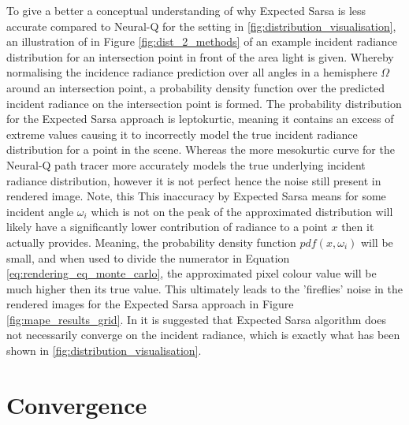 \documentclass[../dissertation.tex]{subfiles}
\begin{document}
To give a better a conceptual understanding of why Expected Sarsa is less accurate compared to Neural-Q for the setting in \ref{fig:distribution_visualisation}, an illustration of in Figure \ref{fig:dist_2_methods} of an example incident radiance distribution for an intersection point in front of the area light is given. Whereby normalising the incidence radiance prediction over all angles in a hemisphere $\Omega$ around an intersection point, a probability density function over the predicted incident radiance on the intersection point is formed. The probability distribution for the Expected Sarsa approach is leptokurtic, meaning it contains an excess of extreme values causing it to incorrectly model the true incident radiance distribution for a point in the scene. Whereas the more mesokurtic curve for the Neural-Q path tracer more accurately models the true underlying incident radiance distribution, however it is not perfect hence the noise still present in rendered image. Note, this This inaccuracy by Expected Sarsa means for some incident angle $\omega_i$ which is not on the peak of the approximated distribution will likely have a significantly lower contribution of radiance to a point $x$ then it actually provides. Meaning, the probability density function $pdf(x, \omega_i)$ will be small, and when used to divide the numerator in Equation \ref{eq:rendering_eq_monte_carlo}, the approximated pixel colour value will be much higher then its true value. This ultimately leads to the 'fireflies' noise in the rendered images for the Expected Sarsa approach in Figure \ref{fig:mape_results_grid}. In \cite{dahm2017learning} it is suggested that Expected Sarsa algorithm does not necessarily converge on the incident radiance, which is exactly what has been shown in \ref{fig:distribution_visualisation}.

\section{Convergence}
\label{sec:convergence_learning_incident}
\end{document}
